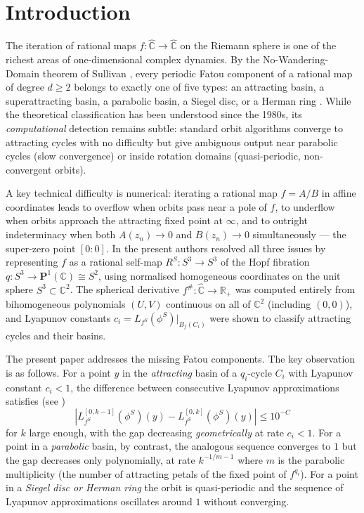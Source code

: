 \documentclass[12pt]{article}
\theoremstyle{definition}
\newcommand{\C}{\mathbb{C}}
\newcommand{\R}{\mathbb{R}}
\newcommand{\Chat}{\hat{\C}}
\newcommand{\Pone}{\mathbf{P}^1(\C)}
\newcommand{\fsh}{f^{\#}}            %
\newcommand{\RS}{R^S}
\begin{document}
\tableofcontents

\section{Introduction}
\label{sec:intro}

The iteration of rational maps $f: \Chat \to \Chat$ on the Riemann sphere
is one of the richest areas of one-dimensional complex dynamics.  By the
No-Wandering-Domain theorem of Sullivan \cite{Sullivan1983}, every periodic
Fatou component of a rational map of degree $d \ge 2$ belongs to exactly
one of five types: an attracting basin, a superattracting basin, a
parabolic basin, a Siegel disc, or a Herman ring \cite{Milnor2006,
Beardon1991}.  While the theoretical classification has been understood
since the 1980s, its \emph{computational} detection remains subtle:
standard orbit algorithms converge to attracting cycles with no difficulty
but give ambiguous output near parabolic cycles (slow convergence) or
inside rotation domains (quasi-periodic, non-convergent orbits).

A key technical difficulty is numerical: iterating a rational map
$f = A/B$ in affine coordinates leads to overflow when orbits pass near a
pole of $f$, to underflow when orbits approach the attracting fixed point
at $\infty$, and to outright indeterminacy when both $A(z_n) \to 0$ and
$B(z_n) \to 0$ simultaneously --- the super-zero point $[0:0]$.  In
\cite{Alvarez2023} the present authors resolved all three issues by
representing $f$ as a rational self-map $\RS: S^3 \to S^3$ of the Hopf
fibration $q: S^3 \to \Pone \cong S^2$, using normalised homogeneous
coordinates on the unit sphere $S^3 \subset \C^2$.  The spherical
derivative $\fsh: \Chat \to \R_+$ was computed entirely from bihomogeneous
polynomials $(U,V)$ continuous on all of $\C^2$ (including $(0,0)$), and
Lyapunov constants $c_i = L_{f^S}(\phi^S)|_{B_f(C_i)}$ were shown to
classify attracting cycles and their basins.

The present paper addresses the missing Fatou components.  The key
observation is as follows.  For a point $y$ in the \emph{attracting} basin
of a $q_i$-cycle $C_i$ with Lyapunov constant $c_i < 1$, the difference
between consecutive Lyapunov approximations satisfies (see
\cite[eq.~(29)]{Alvarez2023})
\[
  |L_{f^S}^{[0,k-1]}(\phi^S)(y) - L_{f^S}^{[0,k]}(\phi^S)(y)| \leq
  10^{-C}
\]
for $k$ large enough, with the gap decreasing \emph{geometrically} at rate
$c_i < 1$.  For a point in a \emph{parabolic} basin, by contrast, the
analogous sequence converges to $1$ but the gap decreases only
polynomially, at rate $k^{-1/m-1}$ where $m$ is the parabolic multiplicity
(the number of attracting petals of the fixed point of $f^{q_i}$).  For a
point in a \emph{Siegel disc or Herman ring} the orbit is quasi-periodic
and the sequence of Lyapunov approximations oscillates around $1$ without
converging.
\end{document}
